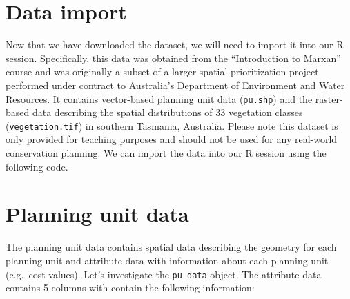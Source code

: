 \documentclass[12pt,]{book}
\newenvironment{Shaded}{\begin{snugshade}}{\end{snugshade}}
\newcommand{\KeywordTok}[1]{\textcolor[rgb]{0.13,0.29,0.53}{\textbf{#1}}}
\newcommand{\StringTok}[1]{\textcolor[rgb]{0.31,0.60,0.02}{#1}}
\newcommand{\CommentTok}[1]{\textcolor[rgb]{0.56,0.35,0.01}{\textit{#1}}}
\newcommand{\OperatorTok}[1]{\textcolor[rgb]{0.81,0.36,0.00}{\textbf{#1}}}
\newcommand{\NormalTok}[1]{#1}
\begin{document}
\section{Data import}\label{data-import}

Now that we have downloaded the dataset, we will need to import it into
our R session. Specifically, this data was obtained from the
``Introduction to Marxan'' course and was originally a subset of a
larger spatial prioritization project performed under contract to
Australia's Department of Environment and Water Resources. It contains
vector-based planning unit data (\texttt{pu.shp}) and the raster-based
data describing the spatial distributions of 33 vegetation classes
(\texttt{vegetation.tif}) in southern Tasmania, Australia. Please note
this dataset is only provided for teaching purposes and should not be
used for any real-world conservation planning. We can import the data
into our R session using the following code.

\begin{Shaded}
\end{Shaded}

\clearpage

\section{Planning unit data}\label{planning-unit-data}

The planning unit data contains spatial data describing the geometry for
each planning unit and attribute data with information about each
planning unit (e.g.~cost values). Let's investigate the
\texttt{pu\_data} object. The attribute data contains 5 columns with
contain the following information:
\end{document}
